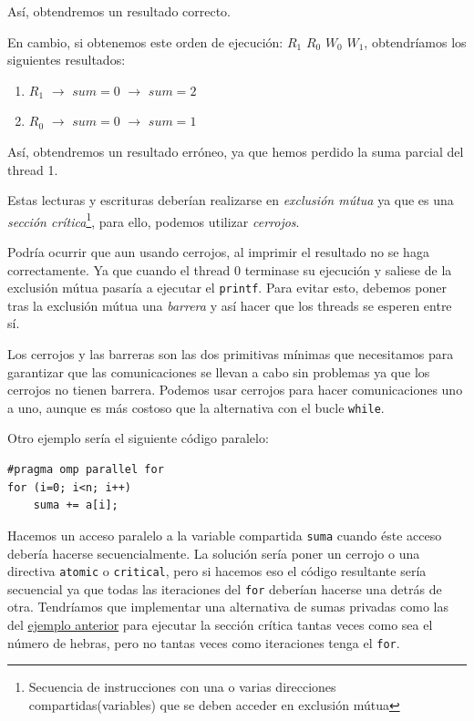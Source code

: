 \documentclass[10pt,a4paper,spanish]{report}
\begin{document}
Así, obtendremos un resultado correcto.

En cambio, si obtenemos este orden de ejecución: $R_1$ $R_0$ $W_0$ $W_1$, obtendríamos los siguientes resultados:
\begin{enumerate}[\color{azul}{ \bf $\heartsuit$}]
    \item $R_1$ $\longrightarrow$ $sum = 0$ $\longrightarrow$ $sum = 2$
    \item $R_0$ $\longrightarrow$ $sum = 0$ $\longrightarrow$ $sum = 1$
\end{enumerate}

Así, obtendremos un resultado erróneo, ya que hemos perdido la suma parcial del thread 1.

Estas lecturas y escrituras deberían realizarse en \textit{\textcolor[rgb]{0.2,0.4,0.8}{exclusión mútua}} ya que es una \textit{\textcolor[rgb]{0.2,0.4,0.8}{sección crítica}}\footnote{Secuencia de instrucciones con una o varias direcciones compartidas(variables) que se deben acceder en exclusión mútua}, para ello, podemos utilizar \textit{\textcolor[rgb]{0.2,0.4,0.8}{cerrojos}}.

Podría ocurrir que aun usando cerrojos, al imprimir el resultado no se haga correctamente. Ya que cuando el thread 0 terminase su ejecución y saliese de la exclusión mútua pasaría a ejecutar el \verb*|printf|. Para evitar esto, debemos poner tras la exclusión mútua una \textcolor[rgb]{0.2,0.4,0.8}{\textit{barrera}} y así hacer que los threads se esperen entre sí.

Los cerrojos y las barreras son las dos primitivas mínimas que necesitamos para garantizar que las comunicaciones se llevan a cabo sin problemas ya que los cerrojos no tienen barrera. Podemos usar cerrojos para hacer comunicaciones uno a uno, aunque es más costoso que la alternativa con el bucle \verb*|while|.

Otro ejemplo sería el siguiente código paralelo:
\begin{verbatim}
#pragma omp parallel for
for (i=0; i<n; i++)
    suma += a[i];
\end{verbatim}

Hacemos un acceso paralelo a la variable compartida \verb*|suma| cuando éste acceso debería hacerse secuencialmente. La solución sería poner un cerrojo o una directiva \verb*|atomic| o \verb*|critical|, pero si hacemos eso el código resultante sería secuencial ya que todas las iteraciones del \verb*|for| deberían hacerse una detrás de otra. Tendríamos que implementar una alternativa de sumas privadas como las del \hyperref[sump]{ejemplo anterior} para ejecutar la sección crítica tantas veces como sea el número de hebras, pero no tantas veces como iteraciones tenga el \verb*|for|.
\end{document}
